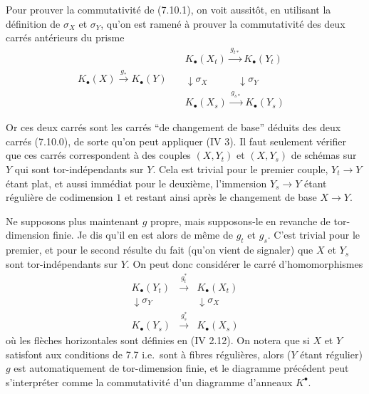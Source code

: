 Pour prouver la commutativit\'e de (7.10.1), on voit aussit\^ot, en utilisant la d\'efinition de $\sigma_{X}$ et $\sigma_{Y}$, qu'on est ramen\'e \`a prouver la commutativit\'e des deux carr\'es ant\'erieurs du prisme
\[
\begin{array}{ccc}
& K_{\bullet}(X_{t}) \xrightarrow{\,g_{t*}\,} K_{\bullet}(Y_{t}) & \\[6pt]
K_{\bullet}(X) \xrightarrow{\,g_{*}\,} K_{\bullet}(Y) \quad & \downarrow{\scriptstyle \sigma_{X}} \quad\quad\quad \downarrow{\scriptstyle \sigma_{Y}} & \\[6pt]
& K_{\bullet}(X_{s}) \xrightarrow{\,g_{s*}\,} K_{\bullet}(Y_{s}) &
\end{array}
\tag{$*$}
\]

Or ces deux carr\'es sont les carr\'es ``de changement de base'' d\'eduits des deux carr\'es (7.10.0), de sorte qu'on peut appliquer (IV 3). Il faut seulement v\'erifier que ces carr\'es correspondent \`a des couples $(X, Y_{t})$ et $(X, Y_{s})$ de sch\'emas sur $Y$ qui sont tor-ind\'ependants sur $Y$. Cela est trivial pour le premier couple, $Y_{t} \to Y$ \'etant plat, et aussi imm\'ediat pour le deuxi\`eme, l'immersion $Y_{s} \to Y$ \'etant r\'eguli\`ere de codimension $1$ et restant ainsi apr\`es le changement de base $X \to Y$.

Ne supposons plus maintenant $g$ propre, mais supposons-le en revanche de tor-dimension finie. Je dis qu'il en est alors de m\^eme de $g_{t}$ et $g_{s}$. C'est trivial pour le premier, et pour le second r\'esulte du fait (qu'on vient de signaler) que $X$ et $Y_{s}$ sont tor-ind\'ependants sur $Y$. On peut donc consid\'erer le carr\'e d'homomorphismes
\begin{equation}\label{eq:7.10.2}
\begin{array}{ccc}
K_{\bullet}(Y_{t}) & \xrightarrow{\,g_{t}^{*}\,} & K_{\bullet}(X_{t}) \\
\downarrow{\scriptstyle \sigma_{Y}} & & \downarrow{\scriptstyle \sigma_{X}} \\
K_{\bullet}(Y_{s}) & \xrightarrow{\,g_{s}^{*}\,} & K_{\bullet}(X_{s})
\end{array}
\end{equation}
o\`u les fl\`eches horizontales sont d\'efinies en (IV 2.12). On notera que si $X$ et $Y$ satisfont aux conditions de 7.7 i.e.\ sont \`a fibres r\'eguli\`eres, alors ($Y$ \'etant r\'egulier) $g$ est automatiquement de tor-dimension finie, et le diagramme pr\'ec\'edent peut s'interpr\'eter comme la commutativit\'e d'un diagramme d'anneaux $K^{\bullet}$.

